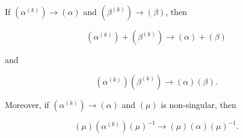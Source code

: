 If $(\alpha^{(k)}) \rightarrow (\alpha)$ and $(\beta^{(k)}) \rightarrow (\beta)$, then

$$(\alpha^{(k)}) + (\beta^{(k)}) \rightarrow (\alpha) + (\beta)$$

and

$$(\alpha^{(k)})(\beta^{(k)}) \rightarrow (\alpha)(\beta).$$

Moreover, if $(\alpha^{(k)}) \rightarrow (\alpha)$ and $(\mu)$ is non-singular, then

$$(\mu)(\alpha^{(k)})(\mu)^{-1} \rightarrow (\mu)(\alpha)(\mu)^{-1}.$$
